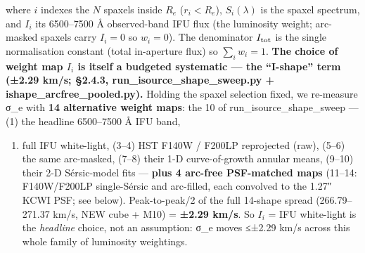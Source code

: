\documentclass[
]{article}
\providecommand{\tightlist}{%
  \setlength{\itemsep}{0pt}\setlength{\parskip}{0pt}}
\newcommand{\BreakablePath}[1]{{\ttfamily\sloppy #1}}
\begin{document}
\begin{itemize}
  where \(i\) indexes the \(N\) spaxels inside \(R_e\) (\(r_i < R_e\)),
  \(S_i(\lambda)\) is the spaxel spectrum, and \(I_i\) its 6500--7500 Å
  observed-band IFU flux (the luminosity weight; arc-masked spaxels
  carry \(I_i=0\) so \(w_i=0\)). The denominator \(I_{\rm tot}\) is the
  single normalisation constant (total in-aperture flux) so
  \(\sum_i w_i = 1\). \textbf{The choice of weight map \(I_i\) is itself
  a budgeted systematic --- the ``I-shape'' term (±2.29 km/s; §2.4.3,
  \BreakablePath{run\_\discretionary{}{}{}isource\_\discretionary{}{}{}shape\_\discretionary{}{}{}sweep.\discretionary{}{}{}py}
  +
  \BreakablePath{ishape\_\discretionary{}{}{}arcfree\_\discretionary{}{}{}pooled.\discretionary{}{}{}py}).}
  Holding the spaxel selection fixed, we re-measure σ\_e with \textbf{14
  alternative weight maps}: the 10 of
  \BreakablePath{run\_\discretionary{}{}{}isource\_\discretionary{}{}{}shape\_\discretionary{}{}{}sweep}
  --- (1) the headline 6500--7500 Å IFU band,

  \begin{enumerate}
  \def\labelenumi{(\arabic{enumi})}
  \setcounter{enumi}{1}
  \tightlist
  \item
    full IFU white-light, (3--4) HST F140W / F200LP reprojected (raw),
    (5--6) the same arc-masked, (7--8) their 1-D curve-of-growth annular
    means, (9--10) their 2-D Sérsic-model fits --- \textbf{plus 4
    arc-free PSF-matched maps} (11--14: F140W/F200LP single-Sérsic and
    arc-filled, each convolved to the 1.27″ KCWI PSF; see below).
    Peak-to-peak/2 of the full 14-shape spread (266.79--271.37 km/s, NEW
    cube + M10) = \textbf{±2.29 km/s}. So \(I_i\) = IFU white-light is
    the \emph{headline} choice, not an assumption: σ\_e moves ≤±2.29
    km/s across this whole family of luminosity weightings.
  \end{enumerate}


\end{itemize}
\end{document}
